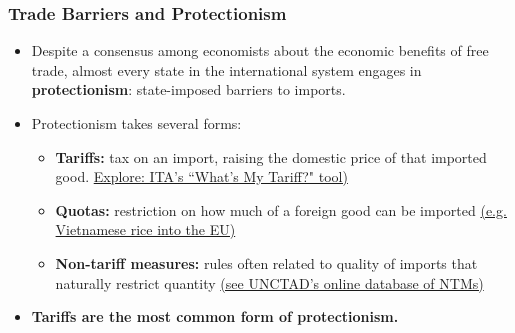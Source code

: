 \documentclass[handout]{beamer}
\begin{document}
\begin{frame} 
	\frametitle{\LARGE{Trade Barriers and Protectionism}}
	\begin{itemize}
		\item Despite a consensus among economists about the economic benefits of free trade, almost every state in the international system engages in \textbf{protectionism}: state-imposed barriers to imports. \pause
		\item Protectionism takes several forms:
		\begin{itemize}
			\item \textbf{Tariffs:} tax on an import, raising the domestic price of that imported good. \href{https://beta.trade.gov/fta/tariff-rates-search}{Explore: ITA's ``What's My Tariff?" tool)} \pause
			\item \textbf{Quotas:} restriction on how much of a foreign good can be imported \href{https://en.vietnamplus.vn/nine-vietnamese-rice-varieties-given-tariff-quotas-in-eu/182888.vnp}{(e.g. Vietnamese rice into the EU)} \pause
			\item \textbf{Non-tariff measures:} rules often related to quality of imports that naturally restrict quantity \href{https://trains.unctad.org/}{(see UNCTAD's online database of NTMs)} 
		\end{itemize}
		\item \textbf{Tariffs are the most common form of protectionism.}
	\end{itemize}
\end{frame}
\end{document}
